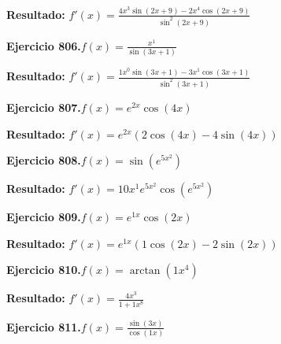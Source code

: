\documentclass[10pt,a4paper]{article}
\begin{document}
\begin{solbox}
\textbf{Resultado:} \(\displaystyle f'(x) = \frac{4x^{3}\sin(2x +9) - 2x^{4}\cos(2x +9)}{\sin^2(2x +9)}\)
\end{solbox}

\begin{ejbox}
\textbf{Ejercicio 806.}\quad $f(x) = \frac{x^{1}}{\sin(3x +1)}$
\end{ejbox}

\begin{solbox}
\textbf{Resultado:} \(\displaystyle f'(x) = \frac{1x^{0}\sin(3x +1) - 3x^{1}\cos(3x +1)}{\sin^2(3x +1)}\)
\end{solbox}

\begin{ejbox}
\textbf{Ejercicio 807.}\quad $f(x) = e^{2x} \cos(4x)$
\end{ejbox}

\begin{solbox}
\textbf{Resultado:} \(\displaystyle f'(x) = e^{2x}(2\cos(4x) - 4\sin(4x))\)
\end{solbox}

\newpage
\begin{ejbox}
\textbf{Ejercicio 808.}\quad $f(x) = \sin(e^{5x^{2}})$
\end{ejbox}

\begin{solbox}
\textbf{Resultado:} \(\displaystyle f'(x) = 10x^{1}e^{5x^{2}}\cos(e^{5x^{2}})\)
\end{solbox}

\begin{ejbox}
\textbf{Ejercicio 809.}\quad $f(x) = e^{1x} \cos(2x)$
\end{ejbox}

\begin{solbox}
\textbf{Resultado:} \(\displaystyle f'(x) = e^{1x}(1\cos(2x) - 2\sin(2x))\)
\end{solbox}

\begin{ejbox}
\textbf{Ejercicio 810.}\quad $f(x) = \arctan(1x^{4})$
\end{ejbox}

\begin{solbox}
\textbf{Resultado:} \(\displaystyle f'(x) = \frac{4x^{3}}{1+1x^{8}}\)
\end{solbox}

\newpage
\begin{ejbox}
\textbf{Ejercicio 811.}\quad $f(x) = \frac{\sin(3x)}{\cos(1x)}$
\end{ejbox}
\end{document}
